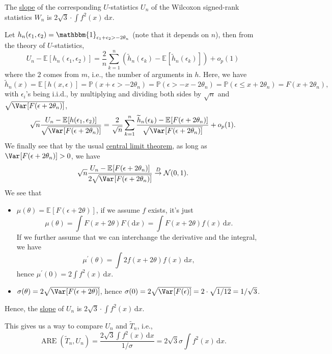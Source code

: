 \begin{eg}
	The \hyperref[def:slope]{slope} of the corresponding \(U\)-statistics \(U_n\) of the Wilcoxon signed-rank statistics \(W_n\) is \(2 \sqrt{3} \cdot \int f^2(x) \,\mathrm{d} x\).
\end{eg}
\begin{explanation}
	Let \(h_n(\epsilon _1, \epsilon _2) = \mathbbm{1}_{\epsilon _1 + \epsilon _2 > - 2 \theta _n} \) (note that it depends on \(n\)), then from the theory of \(U\)-statistics,
	\[
		U_n - \mathbb{E}_{}[h_n(\epsilon _1, \epsilon _2)]
		= \frac{2}{n} \sum_{k=1}^{n} \left( \widetilde{h} _n(\epsilon _k) - \mathbb{E}_{}[\widetilde{h} _n(\epsilon _k)] \right) + o_p(1)
	\]
	where the \(2\) comes from \(m\), i.e., the number of arguments in \(h\). Here, we have
	\[
		\widetilde{h} _n(x)
		= \mathbb{E}_{}[h(x, \epsilon )]
		= \mathbb{P} (x + \epsilon > - 2\theta _n)
		= \mathbb{P} (\epsilon > -x - 2\theta _n)
		= \mathbb{P} (\epsilon \leq x + 2 \theta _n)
		= F(x + 2 \theta _n),
	\]
	with \(\epsilon _i\)'s being i.i.d., by multiplying and dividing both sides by \(\sqrt{n} \) and \(\sqrt{\Var_{}[F(\epsilon + 2 \theta _n)] } \),
	\[
		\sqrt{n} \frac{U_n - \mathbb{E}_{}[h(\epsilon _1 , \epsilon _2)]}{\sqrt{\Var_{}[F(\epsilon + 2 \theta _n)] } }
		= \frac{2}{\sqrt{n} } \sum_{k=1}^{n} \frac{\widetilde{h} _n(\epsilon _k) - \mathbb{E}_{}[F(\epsilon + 2 \theta _n)] }{\sqrt{\Var_{}[F(\epsilon + 2 \theta _n)] } } + o_p(1).
	\]
	We finally see that by the usual \hyperref[thm:CLT]{central limit theorem}, as long as \(\Var_{}[F(\epsilon + 2 \theta _n)] > 0\), we have
	\[
		\sqrt{n} \frac{U_n - \mathbb{E}_{}[F(\epsilon + 2 \theta _n)] }{2 \sqrt{\Var_{}[F(\epsilon + 2 \theta _n)] } }
		\overset{D}{\to} \mathcal{N} (0, 1).
	\]
	We see that
	\begin{itemize}
		\item \(\mu (\theta ) = \mathbb{E}_{}[F(\epsilon + 2 \theta )] \), if we assume \(f\) exists, it's just
		      \[
			      \mu (\theta ) = \int F(x + 2 \theta ) F(\mathrm{d} x)
			      = \int F(x + 2 \theta ) f(x) \,\mathrm{d} x.
		      \]
		      If we further assume that we can interchange the derivative and the integral, we have
		      \[
			      \mu ^{\prime} (\theta )
			      = \int 2 f(x + 2\theta ) f(x) \,\mathrm{d} x,
		      \]
		      hence \(\mu ^{\prime} (0) = 2 \int f^2(x) \,\mathrm{d} x\).
		\item \(\sigma (\theta ) = 2 \sqrt{\Var_{}[F(\epsilon + 2 \theta )] } \), hence \(\sigma (0) = 2 \sqrt{\Var_{}[F(\epsilon )]} = 2 \cdot \sqrt{1 / 12} = 1 / \sqrt{3}  \).
	\end{itemize}
	Hence, the \hyperref[def:slope]{slope} of \(U_n\) is \(2 \sqrt{3} \cdot \int f^2(x) \,\mathrm{d} x\).
\end{explanation}

This gives us a way to compare \(U_n\) and \(\widetilde{T} _n\), i.e.,
\[
	\operatorname{ARE}(\widetilde{T} _n, U_n)
	= \frac{2 \sqrt{3} \int f^2(x)\,\mathrm{d} x}{1 / \sigma }
	= 2\sqrt{3} \sigma \int f^2(x) \,\mathrm{d} x.
\]